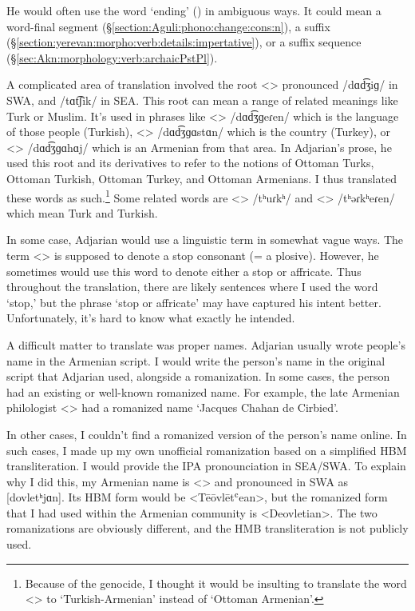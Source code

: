 He would often use the word `ending'  () in ambiguous ways. It could mean a word-final segment (\S\ref{section:Aguli:phono:change:cons:n}), a suffix (\S\ref{section:yerevan:morpho:verb:details:impertative}), or a suffix sequence (\S\ref{sec:Akn:morphology:verb:archaicPstPl}). 

A complicated area of translation involved the root <> pronounced /dɑd͡ʒiɡ/ in SWA, and /tɑt͡ʃik/ in SEA. This root can mean a range of related meanings like Turk or Muslim. It's used in phrases like <> /dɑd͡ʒɡeɾen/ which is the language of those people (Turkish), <> /dɑd͡ʒɡɑstɑn/ which is the country (Turkey), or <> /dɑd͡ʒɡɑhɑj/ which is an Armenian from that area. In Adjarian's prose, he used this root and its derivatives to refer to the notions of  Ottoman Turks, Ottoman Turkish, Ottoman Turkey, and Ottoman Armenians. I thus translated these words as such.\footnote{Because of the genocide, I thought it would be insulting to translate the word  <> to `Turkish-Armenian' instead of `Ottoman Armenian'. } Some related words are <> /tʰuɾkʰ/ and <> /tʰəɾkʰeɾen/ which mean Turk and Turkish. 

In some case, Adjarian would use a linguistic term in somewhat vague ways. The term <> is supposed to denote a stop consonant (= a plosive). However, he sometimes would use this word to denote either a stop or affricate. Thus throughout the translation, there are likely sentences where I used the word `stop,' but the phrase `stop  or affricate' may have captured his intent better. Unfortunately, it's hard to know what exactly he intended. 

A difficult matter to translate was proper names. Adjarian usually wrote people's name in the Armenian script. I would write the person's name in the original script that Adjarian used, alongside a romanization. In some cases, the person had an existing or well-known romanized name. For example, the late Armenian philologist <> had a romanized name `Jacques Chahan de Cirbied'. 

In other cases, I couldn't find a romanized version of the  person's name online. In such cases, I made up my own unofficial romanization based on a simplified HBM transliteration. I would provide  the IPA pronounciation in SEA/SWA.  To explain why I did this, my Armenian name is <> and pronounced in SWA as [dovletʰjɑn]. Its HBM form would be <Tēōvlētʿean>, but the romanized form that I had used within the Armenian community is <Deovletian>.  The two romanizations are obviously different, and the HMB transliteration is not publicly used.

